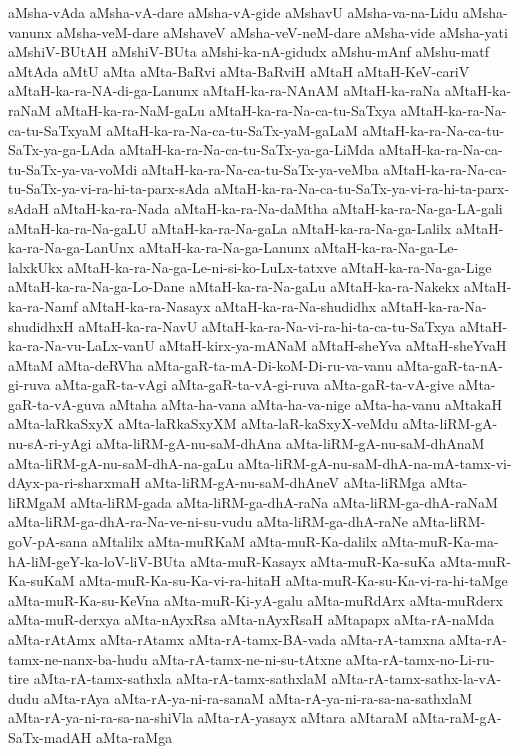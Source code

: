 {aMsha-vAda
aMsha-vA-dare
aMsha-vA-gide
aMshavU
aMsha-va-na-Lidu
aMsha-vanunx
aMsha-veM-dare
aMshaveV
aMsha-veV-neM-dare
aMsha-vide
aMsha-yati
aMshiV-BUtAH
aMshiV-BUta
aMshi-ka-nA-gidudx
aMshu-mAnf
aMshu-matf
aMtAda
aMtU
aMta
aMta-BaRvi
aMta-BaRviH
aMtaH
aMtaH-KeV-cariV
aMtaH-ka-ra-NA-di-ga-Lanunx
aMtaH-ka-ra-NAnAM
aMtaH-ka-raNa
aMtaH-ka-raNaM
aMtaH-ka-ra-NaM-gaLu
aMtaH-ka-ra-Na-ca-tu-SaTxya
aMtaH-ka-ra-Na-ca-tu-SaTxyaM
aMtaH-ka-ra-Na-ca-tu-SaTx-yaM-gaLaM
aMtaH-ka-ra-Na-ca-tu-SaTx-ya-ga-LAda
aMtaH-ka-ra-Na-ca-tu-SaTx-ya-ga-LiMda
aMtaH-ka-ra-Na-ca-tu-SaTx-ya-va-voMdi
aMtaH-ka-ra-Na-ca-tu-SaTx-ya-veMba
aMtaH-ka-ra-Na-ca-tu-SaTx-ya-vi-ra-hi-ta-parx-sAda
aMtaH-ka-ra-Na-ca-tu-SaTx-ya-vi-ra-hi-ta-parx-sAdaH
aMtaH-ka-ra-Nada
aMtaH-ka-ra-Na-daMtha
aMtaH-ka-ra-Na-ga-LA-gali
aMtaH-ka-ra-Na-gaLU
aMtaH-ka-ra-Na-gaLa
aMtaH-ka-ra-Na-ga-Lalilx
aMtaH-ka-ra-Na-ga-LanUnx
aMtaH-ka-ra-Na-ga-Lanunx
aMtaH-ka-ra-Na-ga-Le-lalxkUkx
aMtaH-ka-ra-Na-ga-Le-ni-si-ko-LuLx-tatxve
aMtaH-ka-ra-Na-ga-Lige
aMtaH-ka-ra-Na-ga-Lo-Dane
aMtaH-ka-ra-Na-gaLu
aMtaH-ka-ra-Nakekx
aMtaH-ka-ra-Namf
aMtaH-ka-ra-Nasayx
aMtaH-ka-ra-Na-shudidhx
aMtaH-ka-ra-Na-shudidhxH
aMtaH-ka-ra-NavU
aMtaH-ka-ra-Na-vi-ra-hi-ta-ca-tu-SaTxya
aMtaH-ka-ra-Na-vu-LaLx-vanU
aMtaH-kirx-ya-mANaM
aMtaH-sheYva
aMtaH-sheYvaH
aMtaM
aMta-deRVha
aMta-gaR-ta-mA-Di-koM-Di-ru-va-vanu
aMta-gaR-ta-nA-gi-ruva
aMta-gaR-ta-vAgi
aMta-gaR-ta-vA-gi-ruva
aMta-gaR-ta-vA-give
aMta-gaR-ta-vA-guva
aMtaha
aMta-ha-vana
aMta-ha-va-nige
aMta-ha-vanu
aMtakaH
aMta-laRkaSxyX
aMta-laRkaSxyXM
aMta-laR-kaSxyX-veMdu
aMta-liRM-gA-nu-sA-ri-yAgi
aMta-liRM-gA-nu-saM-dhAna
aMta-liRM-gA-nu-saM-dhAnaM
aMta-liRM-gA-nu-saM-dhA-na-gaLu
aMta-liRM-gA-nu-saM-dhA-na-mA-tamx-vi-dAyx-pa-ri-sharxmaH
aMta-liRM-gA-nu-saM-dhAneV
aMta-liRMga
aMta-liRMgaM
aMta-liRM-gada
aMta-liRM-ga-dhA-raNa
aMta-liRM-ga-dhA-raNaM
aMta-liRM-ga-dhA-ra-Na-ve-ni-su-vudu
aMta-liRM-ga-dhA-raNe
aMta-liRM-goV-pA-sana
aMtalilx
aMta-muRKaM
aMta-muR-Ka-dalilx
aMta-muR-Ka-ma-hA-liM-geY-ka-loV-liV-BUta
aMta-muR-Kasayx
aMta-muR-Ka-suKa
aMta-muR-Ka-suKaM
aMta-muR-Ka-su-Ka-vi-ra-hitaH
aMta-muR-Ka-su-Ka-vi-ra-hi-taMge
aMta-muR-Ka-su-KeVna
aMta-muR-Ki-yA-galu
aMta-muRdArx
aMta-muRderx
aMta-muR-derxya
aMta-nAyxRsa
aMta-nAyxRsaH
aMtapapx
aMta-rA-naMda
aMta-rAtAmx
aMta-rAtamx
aMta-rA-tamx-BA-vada
aMta-rA-tamxna
aMta-rA-tamx-ne-nanx-ba-hudu
aMta-rA-tamx-ne-ni-su-tAtxne
aMta-rA-tamx-no-Li-ru-tire
aMta-rA-tamx-sathxla
aMta-rA-tamx-sathxlaM
aMta-rA-tamx-sathx-la-vA-dudu
aMta-rAya
aMta-rA-ya-ni-ra-sanaM
aMta-rA-ya-ni-ra-sa-na-sathxlaM
aMta-rA-ya-ni-ra-sa-na-shiVla
aMta-rA-yasayx
aMtara
aMtaraM
aMta-raM-gA-SaTx-madAH
aMta-raMga
}
